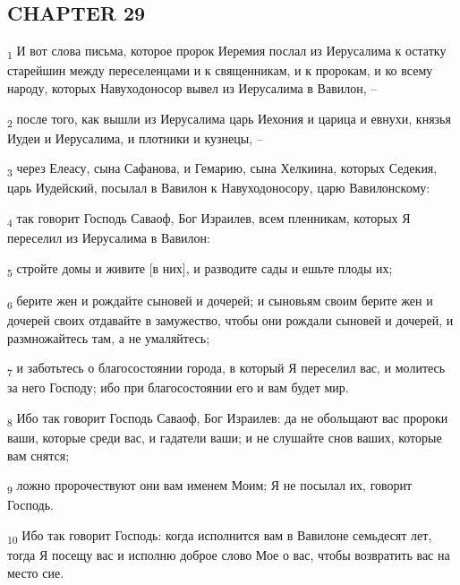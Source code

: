 \subsection{CHAPTER 29}
\begin{tcolorbox}
\textsubscript{1} И вот слова письма, которое пророк Иеремия послал из Иерусалима к остатку старейшин между переселенцами и к священникам, и к пророкам, и ко всему народу, которых Навуходоносор вывел из Иерусалима в Вавилон, --
\end{tcolorbox}
\begin{tcolorbox}
\textsubscript{2} после того, как вышли из Иерусалима царь Иехония и царица и евнухи, князья Иудеи и Иерусалима, и плотники и кузнецы, --
\end{tcolorbox}
\begin{tcolorbox}
\textsubscript{3} через Елеасу, сына Сафанова, и Гемарию, сына Хелкиина, которых Седекия, царь Иудейский, посылал в Вавилон к Навуходоносору, царю Вавилонскому:
\end{tcolorbox}
\begin{tcolorbox}
\textsubscript{4} так говорит Господь Саваоф, Бог Израилев, всем пленникам, которых Я переселил из Иерусалима в Вавилон:
\end{tcolorbox}
\begin{tcolorbox}
\textsubscript{5} стройте домы и живите [в них], и разводите сады и ешьте плоды их;
\end{tcolorbox}
\begin{tcolorbox}
\textsubscript{6} берите жен и рождайте сыновей и дочерей; и сыновьям своим берите жен и дочерей своих отдавайте в замужество, чтобы они рождали сыновей и дочерей, и размножайтесь там, а не умаляйтесь;
\end{tcolorbox}
\begin{tcolorbox}
\textsubscript{7} и заботьтесь о благосостоянии города, в который Я переселил вас, и молитесь за него Господу; ибо при благосостоянии его и вам будет мир.
\end{tcolorbox}
\begin{tcolorbox}
\textsubscript{8} Ибо так говорит Господь Саваоф, Бог Израилев: да не обольщают вас пророки ваши, которые среди вас, и гадатели ваши; и не слушайте снов ваших, которые вам снятся;
\end{tcolorbox}
\begin{tcolorbox}
\textsubscript{9} ложно пророчествуют они вам именем Моим; Я не посылал их, говорит Господь.
\end{tcolorbox}
\begin{tcolorbox}
\textsubscript{10} Ибо так говорит Господь: когда исполнится вам в Вавилоне семьдесят лет, тогда Я посещу вас и исполню доброе слово Мое о вас, чтобы возвратить вас на место сие.
\end{tcolorbox}
